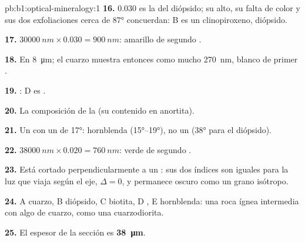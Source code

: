\begin{solution}{pb:b1:optical-mineralogy:1}
\textbf{16.} $0.030$ es la  del diópsido; su  alto, su falta de color y sus dos exfoliaciones cerca
de \ang{87} concuerdan: B es un clinopiroxeno, diópsido.

\textbf{17.} $\qty{30000}{nm}\times0.030 = \qty{900}{nm}$: amarillo de segundo .

\textbf{18.} En \qty{8}{\micro m}; el cuarzo muestra entonces como mucho \qty{270}{nm}, blanco de primer .

\textbf{19.} : D es .

\textbf{20.} La composición de la  (su contenido en anortita).

\textbf{21.} Un  con un  de \ang{17}: hornblenda (\ang{15}--\ang{19}), no un 
(\ang{38} para el diópsido).

\textbf{22.} $\qty{38000}{nm}\times0.020 = \qty{760}{nm}$: verde de segundo .

\textbf{23.} Está cortado perpendicularmente a un : sus dos índices son iguales para la luz que viaja según el eje,
$\Delta = 0$, y permanece oscuro como un grano isótropo.

\textbf{24.} A cuarzo, B diópsido, C biotita, D , E hornblenda: una roca ígnea intermedia con algo de cuarzo, como
una cuarzodiorita.

\textbf{25.} El espesor de la sección es \textbf{\qty[text-series-to-math=true]{38}{\micro m}}.
\end{solution}
